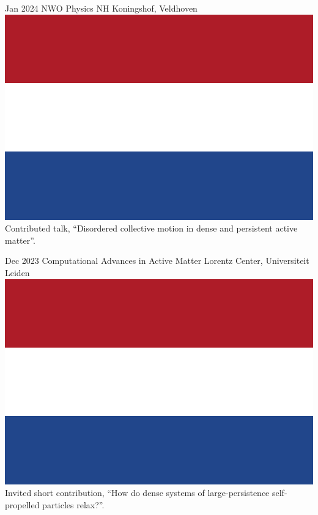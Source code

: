 \documentclass[a4paper]{cvtemplate_en} %
\begin{document}
\begin{cvbody}

\cvitem
	{Jan 2024}
	{}
	{NWO Physics}
	{NH Koningshof, Veldhoven \includegraphics[height=0.8\myheight]{nl}\vspace{-5pt}}
	{}{}{}
	{}
	{Contributed talk, ``Disordered collective motion in dense and persistent active matter''.\\}

\cvitem
	{Dec 2023}
	{}
	{Computational Advances in Active Matter}
	{Lorentz Center, Universiteit Leiden \includegraphics[height=0.8\myheight]{nl}}
	{}{}{}
	{}
	{Invited short contribution, ``How do dense systems of large-persistence self-propelled particles relax?''.\\}


\end{cvbody}
\end{document}
